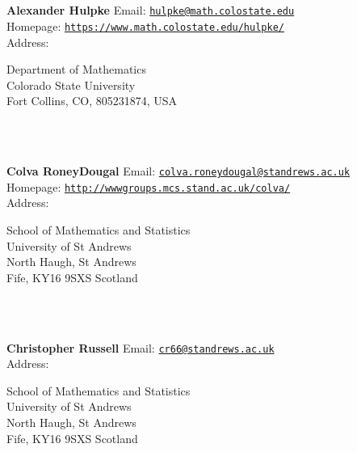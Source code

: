 \documentclass[a4paper,11pt]{report}
\begin{document}
\begin{titlepage}
\mbox{}\\
{\mbox{}\\
\small \noindent \textbf{Alexander Hulpke    }  Email: \href{mailto://hulpke@math.colostate.edu} {\texttt{hulpke@math.colostate.edu}}\\
  Homepage: \href{https://www.math.colostate.edu/~hulpke/} {\texttt{https://www.math.colostate.edu/\texttt{}hulpke/}}\\
  Address: \begin{minipage}[t]{8cm}\noindent
 Department of Mathematics\\
 Colorado State University\\
 Fort Collins, CO, 80523\texttt{}1874, USA \end{minipage}
}\\
{\mbox{}\\
\small \noindent \textbf{Colva Roney\texttt{}Dougal    }  Email: \href{mailto://colva.roney-dougal@st-andrews.ac.uk} {\texttt{colva.roney\texttt{}dougal@st\texttt{}andrews.ac.uk}}\\
  Homepage: \href{http://www-groups.mcs.st-and.ac.uk/~colva/} {\texttt{http://www\texttt{}groups.mcs.st\texttt{}and.ac.uk/\texttt{}colva/}}\\
  Address: \begin{minipage}[t]{8cm}\noindent
 School of Mathematics and Statistics\\
 University of St Andrews\\
 North Haugh, St Andrews\\
 Fife, KY16 9SXS Scotland \end{minipage}
}\\
{\mbox{}\\
\small \noindent \textbf{Christopher Russell   }  Email: \href{mailto://cr66@st-andrews.ac.uk} {\texttt{cr66@st\texttt{}andrews.ac.uk}}\\
  Address: \begin{minipage}[t]{8cm}\noindent
 School of Mathematics and Statistics\\
 University of St Andrews\\
 North Haugh, St Andrews\\
 Fife, KY16 9SXS Scotland \end{minipage}
}\\
\end{titlepage}
\end{document}
